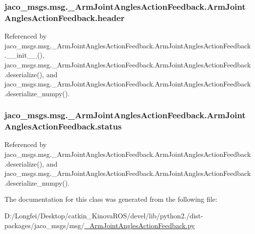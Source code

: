 \subsubsection[{\texorpdfstring{header}{header}}]{\setlength{\rightskip}{0pt plus 5cm}jaco\+\_\+msgs.\+msg.\+\_\+\+Arm\+Joint\+Angles\+Action\+Feedback.\+Arm\+Joint\+Angles\+Action\+Feedback.\+header}\hypertarget{classjaco__msgs_1_1msg_1_1__ArmJointAnglesActionFeedback_1_1ArmJointAnglesActionFeedback_a7b1ea60184ef4d13c068de04538e8b50}{}\label{classjaco__msgs_1_1msg_1_1__ArmJointAnglesActionFeedback_1_1ArmJointAnglesActionFeedback_a7b1ea60184ef4d13c068de04538e8b50}


Referenced by jaco\+\_\+msgs.\+msg.\+\_\+\+Arm\+Joint\+Angles\+Action\+Feedback.\+Arm\+Joint\+Angles\+Action\+Feedback.\+\_\+\+\_\+init\+\_\+\+\_\+(), jaco\+\_\+msgs.\+msg.\+\_\+\+Arm\+Joint\+Angles\+Action\+Feedback.\+Arm\+Joint\+Angles\+Action\+Feedback.\+deserialize(), and jaco\+\_\+msgs.\+msg.\+\_\+\+Arm\+Joint\+Angles\+Action\+Feedback.\+Arm\+Joint\+Angles\+Action\+Feedback.\+deserialize\+\_\+numpy().

\subsubsection[{\texorpdfstring{status}{status}}]{\setlength{\rightskip}{0pt plus 5cm}jaco\+\_\+msgs.\+msg.\+\_\+\+Arm\+Joint\+Angles\+Action\+Feedback.\+Arm\+Joint\+Angles\+Action\+Feedback.\+status}\hypertarget{classjaco__msgs_1_1msg_1_1__ArmJointAnglesActionFeedback_1_1ArmJointAnglesActionFeedback_a8f64e8403349abcd0a905118e41ba76d}{}\label{classjaco__msgs_1_1msg_1_1__ArmJointAnglesActionFeedback_1_1ArmJointAnglesActionFeedback_a8f64e8403349abcd0a905118e41ba76d}


Referenced by jaco\+\_\+msgs.\+msg.\+\_\+\+Arm\+Joint\+Angles\+Action\+Feedback.\+Arm\+Joint\+Angles\+Action\+Feedback.\+deserialize(), and jaco\+\_\+msgs.\+msg.\+\_\+\+Arm\+Joint\+Angles\+Action\+Feedback.\+Arm\+Joint\+Angles\+Action\+Feedback.\+deserialize\+\_\+numpy().



The documentation for this class was generated from the following file\+:\begin{DoxyCompactItemize}
\item 
D\+:/\+Longfei/\+Desktop/catkin\+\_\+\+Kinova\+R\+O\+S/devel/lib/python2./dist-\/packages/jaco\+\_\+msgs/msg/\hyperlink{__ArmJointAnglesActionFeedback_8py}{\+\_\+\+Arm\+Joint\+Angles\+Action\+Feedback.\+py}\end{DoxyCompactItemize}
